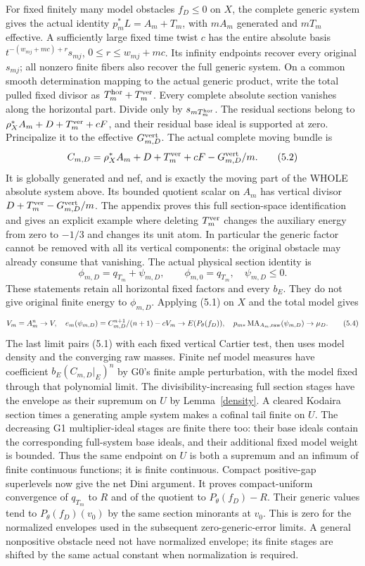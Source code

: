 \documentclass[10pt]{article}
\newcommand{\MA}{\operatorname{MA}}
\begin{document}
For fixed finitely many model obstacles $f_D\leq0$ on $X$, the complete
generic system gives the actual identity $p_m^*L=A_m+T_m$, with
$mA_m$ generated and $mT_m$ effective. A sufficiently large fixed time
twist $c$ has the entire absolute basis
$t^{-(w_{mj}+mc)+r}s_{mj}$, $0\leq r\leq w_{mj}+mc$.
Its infinity endpoints recover every original $s_{mj}$; all nonzero
finite fibers also recover the full generic system. On a common smooth
determination mapping to the actual generic product, write the total
pulled fixed divisor as $T_m^{\rm hor}+T_m^{\rm ver}$.
Every complete absolute section vanishes along the horizontal part.
Divide only by $s_{mT_m^{\rm hor}}$. The residual sections belong to
$\rho_X^*A_m+D+T_m^{\rm ver}+cF$, and their residual base ideal
is supported at zero. Principalize it to the effective
$G_{m,D}^{\rm vert}$. The actual complete moving bundle is
\[
 C_{m,D}=\rho_X^*A_m+D+T_m^{\rm ver}+cF
                         -G_{m,D}^{\rm vert}/m.
 \tag{5.2}
\]
It is globally generated and nef, and is exactly the moving part of the
WHOLE absolute system above. Its bounded quotient scalar on $A_m$
has vertical divisor $D+T_m^{\rm ver}-G_{m,D}^{\rm vert}/m$.
The appendix proves this full section-space identification and gives
an explicit example where deleting $T_m^{\rm ver}$ changes the
auxiliary energy from zero to $-1/3$ and changes its unit atom.
In particular the generic factor cannot be removed with all its vertical
components: the original obstacle may already consume that vanishing. The actual physical section identity is
\[
 \phi_{m,D}=q_{T_m}+\psi_{m,D},\qquad\phi_{m,0}=q_{T_m},
 \quad\psi_{m,D}\leq0.
 \tag{5.3}
\]
These statements retain all horizontal fixed factors and every $b_E$.
They do not give original finite energy to $\phi_{m,D}$.
Applying (5.1) on $X$ and the total model gives
\[
 V_m=A_m^n\to V,\quad
 e_m(\psi_{m,D})=C_{m,D}^{n+1}/(n+1)-cV_m\to E(P_\theta(f_D)),
 \quad p_{m*}\MA_{A_m,\rm raw}(\psi_{m,D})\to\mu_D.
 \tag{5.4}
\]
The last limit pairs (5.1) with each fixed vertical Cartier test, then
uses model density and the converging raw masses. Finite nef model
measures have coefficient $b_E(C_{m,D}|_E)^n$ by G0's finite ample
perturbation, with the model fixed through that polynomial limit.
The divisibility-increasing full section stages have the envelope as
their supremum on $U$ by Lemma~\ref{density}. A cleared Kodaira section
times a generating ample system makes a cofinal tail finite on $U$.
The decreasing G1 multiplier-ideal stages are finite there too: their
base ideals contain the corresponding full-system base ideals, and their
additional fixed model weight is bounded. Thus the same endpoint on $U$
is both a supremum and an infimum of finite continuous functions; it is
finite continuous. Compact positive-gap superlevels now give the net
Dini argument. It proves compact-uniform convergence of $q_{T_m}$ to $R$
and of the quotient to $P_\theta(f_D)-R$.
Their generic values tend to $P_\theta(f_D)(v_0)$ by the same section
minorants at $v_0$. This is zero for the normalized envelopes used in
the subsequent zero-generic-error limits. A general nonpositive obstacle
need not have normalized envelope; its finite stages are shifted by the
same actual constant when normalization is required.
\end{document}
